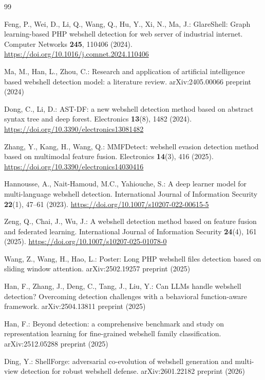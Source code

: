 \documentclass[pdflatex,sn-mathphys-num]{sn-jnl}
\begin{document}
\begin{thebibliography}{99}

Feng, P., Wei, D., Li, Q., Wang, Q., Hu, Y., Xi, N., Ma, J.: GlareShell: Graph
learning-based PHP webshell detection for web server of industrial internet.
Computer Networks \textbf{245}, 110406 (2024).
\url{https://doi.org/10.1016/j.comnet.2024.110406}

Ma, M., Han, L., Zhou, C.: Research and application of artificial intelligence
based webshell detection model: a literature review. arXiv:2405.00066 preprint
(2024)

Dong, C., Li, D.: AST-DF: a new webshell detection method based on abstract
syntax tree and deep forest. Electronics \textbf{13}(8), 1482 (2024).
\url{https://doi.org/10.3390/electronics13081482}

Zhang, Y., Kang, H., Wang, Q.: MMFDetect: webshell evasion detection method
based on multimodal feature fusion. Electronics \textbf{14}(3), 416 (2025).
\url{https://doi.org/10.3390/electronics14030416}

Hannousse, A., Nait-Hamoud, M.C., Yahiouche, S.: A deep learner model for
multi-language webshell detection. International Journal of Information
Security \textbf{22}(1), 47--61 (2023).
\url{https://doi.org/10.1007/s10207-022-00615-5}

Zeng, Q., Chai, J., Wu, J.: A webshell detection method based on feature fusion
and federated learning. International Journal of Information Security
\textbf{24}(4), 161 (2025). \url{https://doi.org/10.1007/s10207-025-01078-0}

Wang, Z., Wang, H., Hao, L.: Poster: Long PHP webshell files detection based on
sliding window attention. arXiv:2502.19257 preprint (2025)

Han, F., Zhang, J., Deng, C., Tang, J., Liu, Y.: Can LLMs handle webshell
detection? Overcoming detection challenges with a behavioral function-aware
framework. arXiv:2504.13811 preprint (2025)

Han, F.: Beyond detection: a comprehensive benchmark and study on
representation learning for fine-grained webshell family classification.
arXiv:2512.05288 preprint (2025)

Ding, Y.: ShellForge: adversarial co-evolution of webshell generation and
multi-view detection for robust webshell defense. arXiv:2601.22182 preprint
(2026)


\end{thebibliography}
\end{document}

